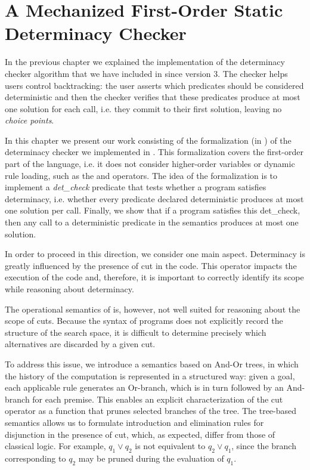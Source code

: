 \chapter{A Mechanized First-Order Static Determinacy Checker}
\label{chap:mechanization}

In the previous chapter we explained the implementation of the determinacy
checker algorithm that we have included in \elpi since version 3. The checker
helps users control backtracking: the user asserts which predicates should be
considered deterministic and then the checker verifies that these predicates
produce at most one solution for each call, i.e. they commit to their first
solution, leaving no \emph{choice points}.

In this chapter we present our work consisting of the formalization (in \rocq)
of the determinacy checker we implemented in \elpi. This formalization covers
the first-order part of the language, i.e. it does not consider higher-order
variables or dynamic rule loading, such as the \pi and \eI{=>} operators. The
idea of the formalization is to implement a \emph{det\_check} predicate that
tests whether a program satisfies determinacy, i.e. whether every predicate
declared deterministic produces at most one solution per call. Finally, we
show that if a program satisfies this det\_check, then any call to a
deterministic predicate in the \elpi semantics produces at most one solution.

In order to proceed in this direction, we consider one main aspect.
Determinacy is greatly influenced by the presence of cut in the code. This
operator impacts the execution of the code and, therefore, it is important to
correctly identify its scope while reasoning about determinacy.

The operational semantics of \elpi is, however, not well suited for reasoning
about the scope of cuts. Because the syntax of \elpi programs does not
explicitly record the structure of the search space, it is difficult to
determine precisely which alternatives are discarded by a given cut.

To address this issue, we introduce a semantics based on And-Or trees, in which
the history of the computation is represented in a structured way: given a goal,
each applicable rule generates an Or-branch, which is in turn followed by an
And-branch for each premise. This enables an explicit characterization of the
cut operator as a function that prunes selected branches of the tree. The
tree-based semantics allows us to formulate introduction and elimination rules
for disjunction in the presence of cut, which, as expected, differ from those of
classical logic. For example, $q_1 \lor q_2$ is not equivalent to $q_2 \lor
q_1$, since the branch corresponding to $q_2$ may be pruned during the
evaluation of $q_1$.


